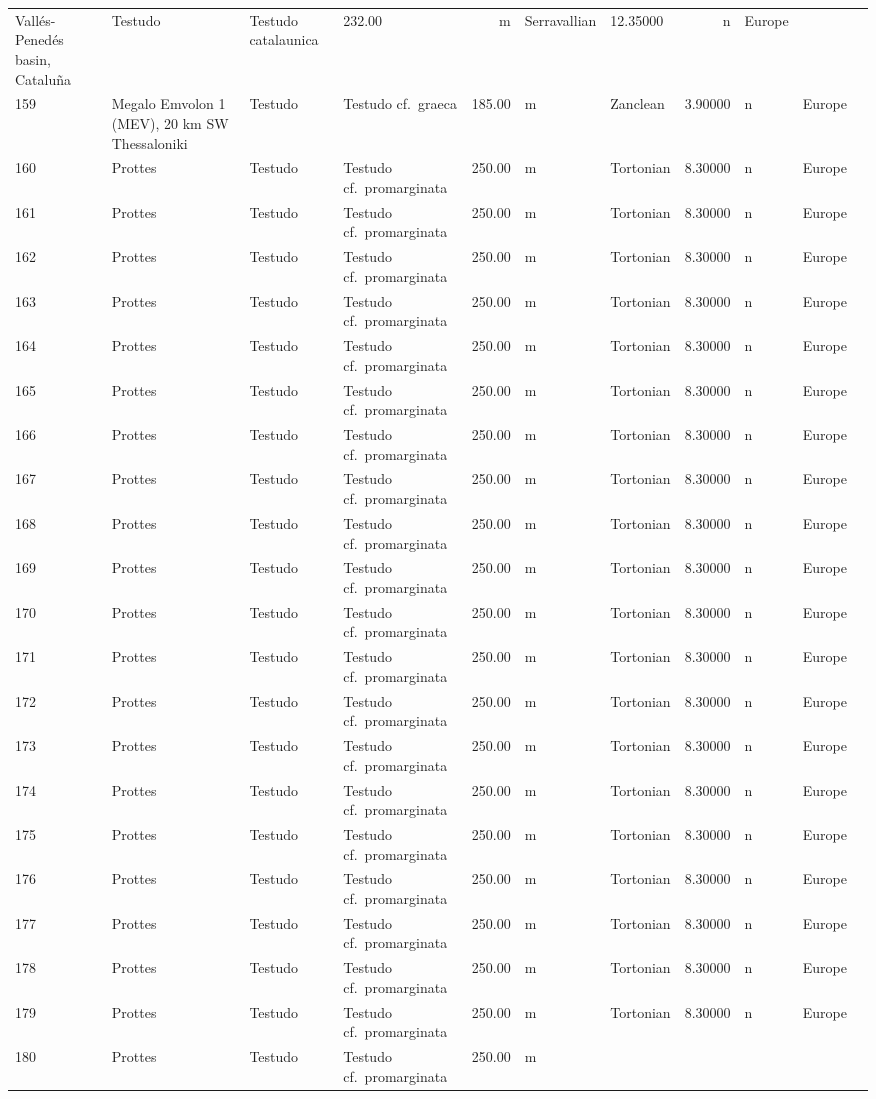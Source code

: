 \begin{landscape}
{\begin{longtable}[]{@{}llllrllrlll@{}}
	Vallés-Penedés basin, Cataluña & Testudo & Testudo catalaunica & 232.00
	& m & Serravallian & 12.35000 & n & Europe\tabularnewline
	159 & Megalo Emvolon 1 (MEV), 20 km SW Thessaloniki & Testudo & Testudo
	cf.~graeca & 185.00 & m & Zanclean & 3.90000 & n & Europe\tabularnewline
	160 & Prottes & Testudo & Testudo cf.~promarginata & 250.00 & m &
	Tortonian & 8.30000 & n & Europe\tabularnewline
	161 & Prottes & Testudo & Testudo cf.~promarginata & 250.00 & m &
	Tortonian & 8.30000 & n & Europe\tabularnewline
	162 & Prottes & Testudo & Testudo cf.~promarginata & 250.00 & m &
	Tortonian & 8.30000 & n & Europe\tabularnewline
	163 & Prottes & Testudo & Testudo cf.~promarginata & 250.00 & m &
	Tortonian & 8.30000 & n & Europe\tabularnewline
	164 & Prottes & Testudo & Testudo cf.~promarginata & 250.00 & m &
	Tortonian & 8.30000 & n & Europe\tabularnewline
	165 & Prottes & Testudo & Testudo cf.~promarginata & 250.00 & m &
	Tortonian & 8.30000 & n & Europe\tabularnewline
	166 & Prottes & Testudo & Testudo cf.~promarginata & 250.00 & m &
	Tortonian & 8.30000 & n & Europe\tabularnewline
	167 & Prottes & Testudo & Testudo cf.~promarginata & 250.00 & m &
	Tortonian & 8.30000 & n & Europe\tabularnewline
	168 & Prottes & Testudo & Testudo cf.~promarginata & 250.00 & m &
	Tortonian & 8.30000 & n & Europe\tabularnewline
	169 & Prottes & Testudo & Testudo cf.~promarginata & 250.00 & m &
	Tortonian & 8.30000 & n & Europe\tabularnewline
	170 & Prottes & Testudo & Testudo cf.~promarginata & 250.00 & m &
	Tortonian & 8.30000 & n & Europe\tabularnewline
	171 & Prottes & Testudo & Testudo cf.~promarginata & 250.00 & m &
	Tortonian & 8.30000 & n & Europe\tabularnewline
	172 & Prottes & Testudo & Testudo cf.~promarginata & 250.00 & m &
	Tortonian & 8.30000 & n & Europe\tabularnewline
	173 & Prottes & Testudo & Testudo cf.~promarginata & 250.00 & m &
	Tortonian & 8.30000 & n & Europe\tabularnewline
	174 & Prottes & Testudo & Testudo cf.~promarginata & 250.00 & m &
	Tortonian & 8.30000 & n & Europe\tabularnewline
	175 & Prottes & Testudo & Testudo cf.~promarginata & 250.00 & m &
	Tortonian & 8.30000 & n & Europe\tabularnewline
	176 & Prottes & Testudo & Testudo cf.~promarginata & 250.00 & m &
	Tortonian & 8.30000 & n & Europe\tabularnewline
	177 & Prottes & Testudo & Testudo cf.~promarginata & 250.00 & m &
	Tortonian & 8.30000 & n & Europe\tabularnewline
	178 & Prottes & Testudo & Testudo cf.~promarginata & 250.00 & m &
	Tortonian & 8.30000 & n & Europe\tabularnewline
	179 & Prottes & Testudo & Testudo cf.~promarginata & 250.00 & m &
	Tortonian & 8.30000 & n & Europe\tabularnewline
	180 & Prottes & Testudo & Testudo cf.~promarginata & 250.00 & m &

\end{longtable}}
\end{landscape}
